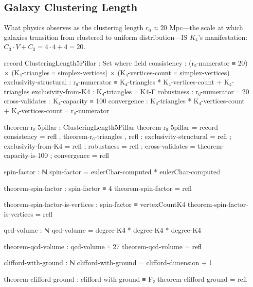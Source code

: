 \documentclass[11pt,a4paper]{book}
\begin{document}
\subsection{Galaxy Clustering Length}

What physics observes as the clustering length $r_0 \approx 20$ Mpc—the scale at which galaxies transition from clustered to uniform distribution—IS $K_4$'s manifestation: $C_3 \cdot V + C_3 = 4 \cdot 4 + 4 = 20$.

\begin{code}
record ClusteringLength5Pillar : Set where
  field
    consistency            : (r₀-numerator ≡ 20) × (K₄-triangles ≡ simplex-vertices) × (K₄-vertices-count ≡ simplex-vertices)
    exclusivity-structural : r₀-numerator ≡ K₄-triangles * K₄-vertices-count + K₄-triangles
    exclusivity-from-K4    : K₄-triangles ≡ K4-F
    robustness             : r₀-numerator ≡ 20
    cross-validates        : K₄-capacity ≡ 100
    convergence            : K₄-triangles * K₄-vertices-count + K₄-vertices-count ≡ r₀-numerator

theorem-r₀-5pillar : ClusteringLength5Pillar
theorem-r₀-5pillar = record
  { consistency            = refl , theorem-r₀-triangles , refl
  ; exclusivity-structural = refl
  ; exclusivity-from-K4    = refl
  ; robustness             = refl
  ; cross-validates        = theorem-capacity-is-100
  ; convergence            = refl
  }
\end{code}

\begin{code}
spin-factor : ℕ
spin-factor = eulerChar-computed * eulerChar-computed

theorem-spin-factor : spin-factor ≡ 4
theorem-spin-factor = refl

theorem-spin-factor-is-vertices : spin-factor ≡ vertexCountK4
theorem-spin-factor-is-vertices = refl

qcd-volume : ℕ
qcd-volume = degree-K4 * degree-K4 * degree-K4

theorem-qcd-volume : qcd-volume ≡ 27
theorem-qcd-volume = refl

clifford-with-ground : ℕ
clifford-with-ground = clifford-dimension + 1

theorem-clifford-ground : clifford-with-ground ≡ F₂
theorem-clifford-ground = refl
\end{code}
\end{document}
